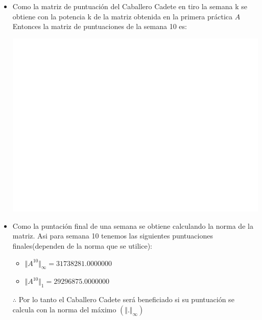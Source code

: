 \documentclass[12pt,a4paper]{article}
\begin{document}
\begin{itemize}
	\item Como la matriz de puntuación del Caballero Cadete en tiro la semana k se obtiene con la potencia k de la matriz obtenida en la primera práctica $A$
	Entonces la matriz de puntuaciones de la semana  10 es:
	\begin{center}
		\includegraphics[page=3,trim= 4.3cm 4cm 4cm 4cm, clip, scale=0.75]{MatrixSimb}
	\end{center}
	
	\item Como la puntación final de una semana se obtiene calculando la norma de la matriz. Asi para semana 10 tenemos las siguientes puntuaciones finales(dependen de la norma que se utilice):
	\begin{itemize}
		\item $\Vert A^{10}\Vert_{\infty} = 31738281.0000000$
		\item $\Vert A^{10}\Vert_{1} = 29296875.0000000$
	\end{itemize}
	$\therefore$ Por lo tanto el Caballero Cadete será beneficiado si su puntuación se calcula con la norma del máximo $(\Vert .\Vert_{\infty})$
\end{itemize}
\end{document}

